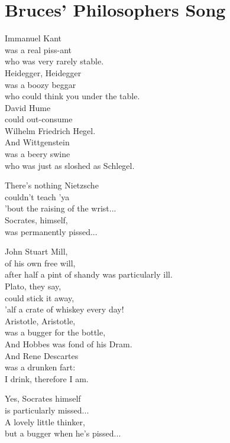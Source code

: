 \section{Bruces' Philosophers Song}
Immanuel Kant\\
was a real piss-ant\\
who was very rarely stable.\\
Heidegger, Heidegger\\
was a boozy beggar\\
who could think you under the table.\\
David Hume\\
could out-consume\\
Wilhelm Friedrich Hegel.\\
And Wittgenstein\\
was a beery swine\\
who was just as sloshed as Schlegel.

There's nothing Nietzsche\\
couldn't teach 'ya\\
'bout the raising of the wrist...\\
Socrates, himself,\\
was permanently pissed...

John Stuart Mill,\\
of his own free will,\\
after half a pint of shandy was particularly ill.\\
Plato, they say,\\
could stick it away,\\
'alf a crate of whiskey every day!\\
Aristotle, Aristotle,\\
was a bugger for the bottle,\\
And Hobbes was fond of his Dram.\\
And Rene Descartes\\
was a drunken fart:\\
I drink, therefore I am.

Yes, Socrates himself\\
is particularly missed...\\
A lovely little thinker,\\
but a bugger when he's pissed...

